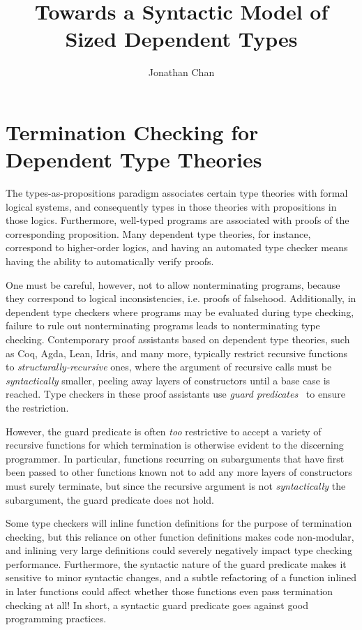 \documentclass[acmsmall,nonacm, screen]{acmart}
\title{Towards a Syntactic Model of Sized Dependent Types}
\author{Jonathan Chan}
\affiliation{
  \institution{University of British Columbia}
  \city{Vancouver}
  \country{Canada},
  \href{mailto:jcxz@cs.ubc.ca}{jcxz@cs.ubc.ca} \\
  Graduate student (MSc.) advised by William J. Bowman
}
\begin{document}
\maketitle

\section{Termination Checking for Dependent Type Theories}

The types-as-propositions paradigm associates certain type theories with formal logical systems,
and consequently types in those theories with propositions in those logics.
Furthermore, well-typed programs are associated with proofs of the corresponding proposition.
Many dependent type theories, for instance, correspond to higher-order logics,
and having an automated type checker means having the ability to automatically verify proofs.

One must be careful, however, not to allow nonterminating programs,
because they correspond to logical inconsistencies, i.e. proofs of falsehood.
Additionally, in dependent type checkers where programs may be evaluated during type checking,
failure to rule out nonterminating programs leads to nonterminating type checking.
Contemporary proof assistants based on dependent type theories, such as Coq, Agda, Lean, Idris,
and many more, typically restrict recursive functions to \emph{structurally-recursive} ones,
where the argument of recursive calls must be \emph{syntactically} smaller,
peeling away layers of constructors until a base case is reached.
Type checkers in these proof assistants use \emph{guard predicates}~\citep{guard-predicate} to ensure the restriction.

However, the guard predicate is often \emph{too} restrictive to accept a variety of recursive functions
for which termination is otherwise evident to the discerning programmer.
In particular, functions recurring on subarguments that have first been passed to other functions
known not to add any more layers of constructors must surely terminate,
but since the recursive argument is not \emph{syntactically} the subargument,
the guard predicate does not hold.

Some type checkers will inline function definitions for the purpose of termination checking,
but this reliance on other function definitions makes code non-modular,
and inlining very large definitions could severely negatively impact type checking performance.
Furthermore, the syntactic nature of the guard predicate makes it sensitive to minor syntactic changes,
and a subtle refactoring of a function inlined in later functions could affect whether
those functions even pass termination checking at all!
In short, a syntactic guard predicate goes against good programming practices.
\end{document}

